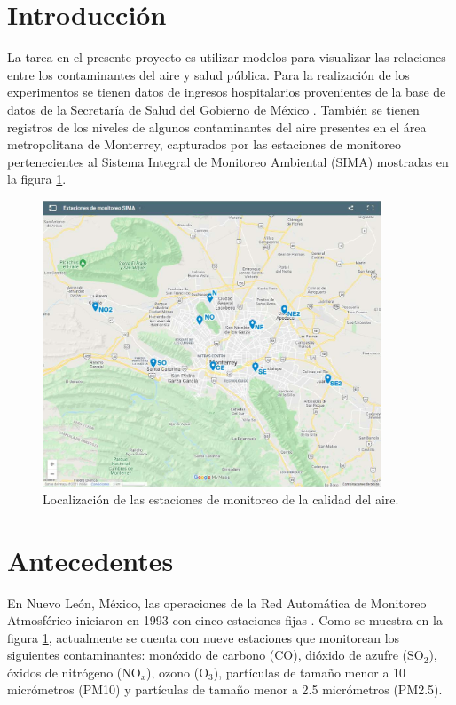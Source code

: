 \documentclass[a0]{sciposter} %
\begin{document}
\begin{multicols}{3} 

\section{Introducción}
La tarea en el presente proyecto es utilizar modelos para visualizar las relaciones entre los contaminantes del aire y salud pública. Para la realización de los experimentos se tienen datos de ingresos hospitalarios provenientes de la base de datos de la Secretaría de Salud del Gobierno de México \cite{f1}. También se tienen registros de los niveles de algunos contaminantes del aire presentes en el área metropolitana de Monterrey, capturados por las estaciones de monitoreo pertenecientes al Sistema Integral de Monitoreo Ambiental (SIMA) \cite{f2} mostradas en la figura \ref{estaciones}.
\begin{figure}[h!]
\setcounter{figure}{0} %
\captionsetup{type=figure} %
\begin{center}
   \includegraphics[trim=50 50 50 50,clip,width=0.9\textwidth]{mapa_estaciones.eps}
   \end{center}
    \caption{Localización de las estaciones de monitoreo de la calidad del aire.}
    \label{estaciones}
\end{figure}

\section{Antecedentes}
En Nuevo León, México, las operaciones de la Red Automática de Monitoreo Atmosférico iniciaron en 1993 con cinco estaciones fijas \citep{r4}. Como se muestra en la figura \ref{estaciones}, actualmente se cuenta con nueve estaciones que monitorean los siguientes contaminantes: monóxido de carbono (CO), dióxido de azufre (SO$_2$), óxidos de nitrógeno (NO$_x$), ozono (O$_3$), partículas de tamaño menor a 10 micrómetros (PM10) y partículas de tamaño menor a 2.5 micrómetros (PM2.5).


\end{multicols}
\end{document}
